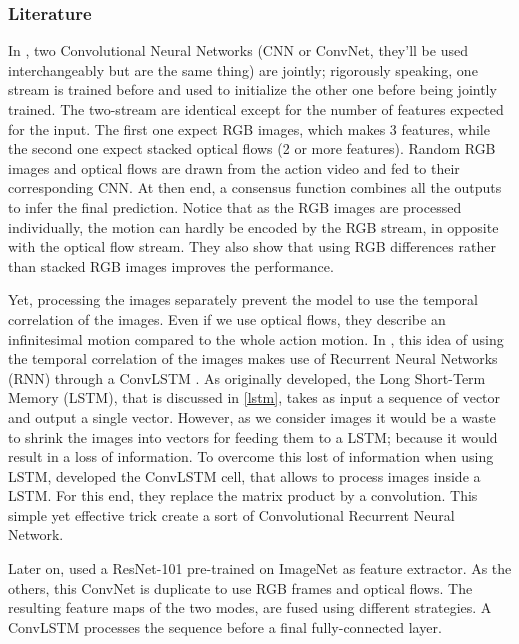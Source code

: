 \documentclass[12pt, a4paper]{report}
\begin{document}
				\subsubsection{Literature}\label{literature}
					In \cite{wang2016temporal}, two Convolutional Neural Networks (CNN or ConvNet, they'll be used interchangeably but are the same thing) are \gls{jointly}; rigorously speaking, one stream is trained before and used to initialize the other one before being jointly trained.
					The two-stream are identical except for the number of features expected for the input.
					The first one expect RGB images, which makes 3 features, while the second one expect stacked optical flows (2 or more features).
					Random RGB images and optical flows are drawn from the action video and fed to their corresponding CNN.
					At then end, a consensus function combines all the outputs to infer the final prediction.
					Notice that as the RGB images are processed individually, the motion can hardly be encoded by the RGB stream, in opposite with the optical flow stream.
					They also show that using RGB differences rather than stacked RGB images improves the performance.
					\par
					Yet, processing the images separately prevent the model to use the temporal correlation of the images.
					Even if we use optical flows, they describe an infinitesimal motion compared to the whole action motion.
					In \cite{ye2019two}, this idea of using the temporal correlation of the images makes use of Recurrent Neural Networks (RNN) through a ConvLSTM \cite{shi2015convolutional}.
					As originally developed, the Long Short-Term Memory (LSTM), that is discussed in \ref{lstm}, takes as input a sequence of vector and output a single vector.
					However, as we consider images it would be a waste to shrink the images into vectors for feeding them to a LSTM; because it would result in a loss of information.
					To overcome this lost of information when using LSTM, \cite{shi2015convolutional} developed the ConvLSTM cell, that allows to process images inside a LSTM.
					For this end, they replace the matrix product by a convolution.
					This simple yet effective trick create a sort of Convolutional Recurrent Neural Network.
					\par
					Later on, \cite{ye2019two} used a ResNet-101 pre-trained on ImageNet as feature extractor.
					As the others, this ConvNet is duplicate to use RGB frames and optical flows.
					The resulting feature maps of the two modes, are fused using different strategies.
					A ConvLSTM processes the sequence before a final fully-connected layer.
\end{document}
